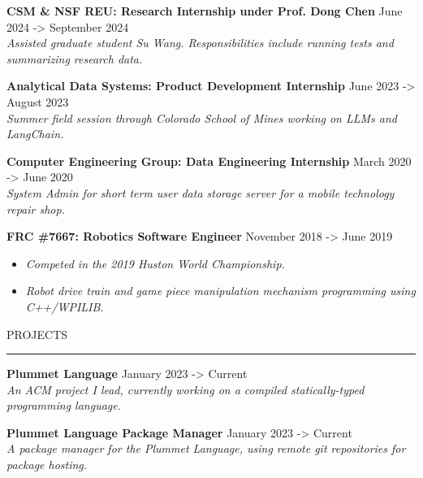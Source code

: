 \documentclass[10pt,letterpaper]{article}
\newcommand{\customtext}[2]{%
    {\fontsize{#1}{\dimexpr #1pt+2pt}\selectfont #2}%
}
\begin{document}
\begin{flushleft}
    {\customtext{12}{\textbf{CSM \& NSF REU: Research Internship under Prof. Dong Chen}} \hfill \customtext{12}{June 2024 -> September 2024}} \\
    \customtext{9}{\textit{Assisted graduate student Su Wang. Responsibilities include running tests and summarizing research data.}}
    \vspace{14pt}

    {\customtext{12}{\textbf{Analytical Data Systems: Product Development Internship}} \hfill \customtext{12}{June 2023 -> August 2023}} \\
    \customtext{9}{\textit{Summer field session through Colorado School of Mines working on LLMs and LangChain.}}
    \vspace{14pt}

    {\customtext{12}{\textbf{Computer Engineering Group: Data Engineering Internship}} \hfill \customtext{12}{March 2020 -> June 2020}} \\
    \customtext{9}{\textit{System Admin for short term user data storage server for a mobile technology repair shop.}}
    \vspace{14pt}

    {\customtext{12}{\textbf{FRC \#7667: Robotics Software Engineer}} \hfill \customtext{12}{November 2018 -> June 2019}} \\
    \begin{itemize}
        \item \customtext{9}{\textit{Competed in the 2019 Huston World Championship.}}
        \item \customtext{9}{\textit{Robot drive train and game piece manipulation mechanism programming using C++/WPILIB.}}
    \end{itemize}
    \vspace{14pt}


    \textcolor{headercolor}{\customtext{14}{PROJECTS}}
    \textcolor{gray}{\rule{\textwidth}{2pt}}

    {\customtext{12}{\textbf{Plummet Language}} \hfill \customtext{12}{January 2023 -> Current}} \\
    \customtext{9}{\textit{An ACM project I lead, currently working on a compiled statically-typed programming language.}}
    \vspace{14pt}

    {\customtext{12}{\textbf{Plummet Language Package Manager}} \hfill \customtext{12}{January 2023 -> Current}} \\
    \customtext{9}{\textit{A package manager for the Plummet Language, using remote git repositories for package hosting.}}
    \vspace{14pt}


\end{flushleft}
\end{document}
